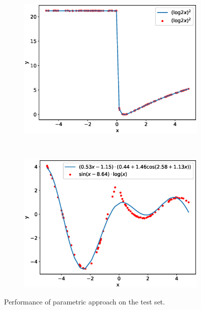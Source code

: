 \documentclass[12pt]{article}
\begin{document}
\begin{figure}[!ht]
\begin{subfigure}{0.48\textwidth}
\caption{}
\label{fig::_res_param_2}
\end{subfigure}
\\
\begin{subfigure}{0.48\textwidth}
\includegraphics[width=\textwidth]{_res_param_3.eps}
\caption{}
\label{fig::_res_param_3}
\end{subfigure}
~
\begin{subfigure}{0.48\textwidth}
\includegraphics[width=\textwidth]{_res_param_4.eps}
\caption{}
\label{fig::_res_param_4}
\end{subfigure}
\caption{Performance of parametric approach on the test set.}
\label{fig::parametric}
\end{figure}
\end{document}
